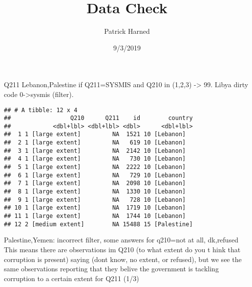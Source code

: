 \documentclass[]{article}
\title{Data Check}
\author{Patrick Harned}
\date{9/3/2019}
\begin{document}
\maketitle

Q211 Lebanon,Palestine if Q211=SYSMIS and Q210 in (1,2,3)
-\textgreater{} 99. Libya dirty code 0-\textgreater{}sysmis (filter).

\begin{verbatim}
## # A tibble: 12 x 4
##                 Q210      Q211    id        country
##            <dbl+lbl> <dbl+lbl> <dbl>      <dbl+lbl>
##  1 1 [large extent]         NA  1521 10 [Lebanon]  
##  2 1 [large extent]         NA   619 10 [Lebanon]  
##  3 1 [large extent]         NA  2142 10 [Lebanon]  
##  4 1 [large extent]         NA   730 10 [Lebanon]  
##  5 1 [large extent]         NA  2222 10 [Lebanon]  
##  6 1 [large extent]         NA   729 10 [Lebanon]  
##  7 1 [large extent]         NA  2098 10 [Lebanon]  
##  8 1 [large extent]         NA  1330 10 [Lebanon]  
##  9 1 [large extent]         NA   728 10 [Lebanon]  
## 10 1 [large extent]         NA  1719 10 [Lebanon]  
## 11 1 [large extent]         NA  1744 10 [Lebanon]  
## 12 2 [medium extent]        NA 15488 15 [Palestine]
\end{verbatim}

Palestine,Yemen: incorrect filter, some answers for q210=not at all,
dk,refused This means there are observations im Q210 (to what extent do
you t hink that corruption is present) saying (dont know, no extent, or
refused), but we see the same observations reporting that they belive
the government is tackling corruption to a certain extent for Q211 (1/3)
\end{document}
